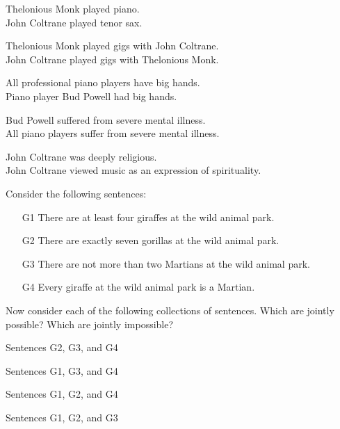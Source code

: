 \begin{earg}
\item  Thelonious Monk played piano.	\\
	John Coltrane played tenor sax. 
\item  Thelonious Monk played gigs with John Coltrane.	\\
	John Coltrane played gigs with Thelonious Monk.
\item  All professional piano players have big hands.	\\
	Piano player Bud Powell had big hands.
\item  Bud Powell suffered from severe mental illness.	 \\
	All piano players suffer from severe mental illness.
\item John Coltrane was deeply religious.	 \\
John Coltrane viewed music as an expression of spirituality. 
\end{earg}

\noindent \problempart Consider the following sentences: 
\begin{enumerate}%
\item[G1] \label{itm:at_least_four}There are at least four giraffes at the wild animal park.
\item[G2] \label{itm:exactly_seven} There are exactly seven gorillas at the wild animal park.
\item[G3] \label{itm:not_more_than_two} There are not more than two Martians at the wild animal park.
\item[G4] \label{itm:martians} Every giraffe at the wild animal park is a Martian.
\end{enumerate}

Now consider each of the following collections of sentences. Which are jointly possible? Which are jointly impossible?
\begin{earg}
\item Sentences G2, G3, and G4
\item Sentences G1, G3, and G4
\item Sentences G1, G2, and G4
\item Sentences G1, G2, and G3
\end{earg}

